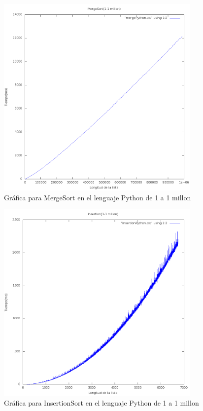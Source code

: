 \documentclass[11 pt, a4paper]{article}
\theoremstyle{definition}
\begin{document}
\begin{enumerate}
\begin{figure}[H]
          \includegraphics[trim=0cm 0cm 0cm 0cm, width=10cm]{1-1mPython.png} 
          \caption{Gráfica para MergeSort en el lenguaje Python de 1 a 1 millon}
      \end{figure}
       \begin{figure}[H]
         \centering
          \includegraphics[trim=0cm 0cm 0cm 0cm, width=10cm]{1-1mIPython.png} 
          \caption{Gráfica para InsertionSort en el lenguaje Python de 1 a 1 millon}
      \end{figure}
      

\end{enumerate}
\end{document}
